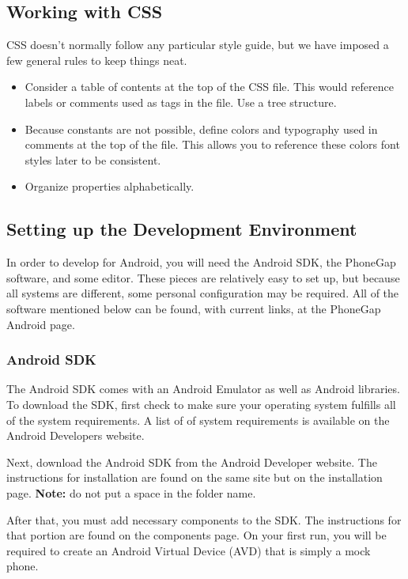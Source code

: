 \documentclass[12pt]{article}
\begin{document}
\subsection{Working with CSS}
CSS doesn't normally follow any particular style guide, but we have imposed a few general rules to keep things neat\cite{CSSStyle-SmashingMagazine}.

\begin{itemize}
\item Consider a table of contents at the top of the CSS file.  This would reference labels or comments used as tags in the file.  Use a tree structure.
\item Because constants are not possible, define colors and typography used in comments at the top of the file.  This allows you to reference these colors font styles later to be consistent.  
\item Organize properties alphabetically.
\end{itemize}

\subsection{Setting up the Development Environment}
In order to develop for Android, you will need the Android SDK, the PhoneGap software, and some editor.  These pieces are relatively easy to set up, but because all systems are different, some personal configuration may be required.  All of the software mentioned below can be found, with current links, at the PhoneGap Android page\cite{PhoneGap-Android}.  

\subsubsection{Android SDK}
The Android SDK comes with an Android Emulator as well as Android libraries.
To download the SDK, first check to make sure your operating system fulfills all of the system requirements.  A list of of system requirements is available on the Android Developers website\cite{AndroidSDK-SystemRequirements}.

Next, download the Android SDK from the Android Developer website\cite{AndroidSDK-Download}.
The instructions for installation are found on the same site but on the installation page\cite{AndroidSDK-Installation}. \textbf{Note:} do not put a space in the folder name.

After that, you must add necessary components to the SDK.  The instructions for that portion are found on the components page\cite{AndroidSDK-Components}.  On your first run, you will be required to create an Android Virtual Device (AVD) that is simply a mock phone.
\end{document}
